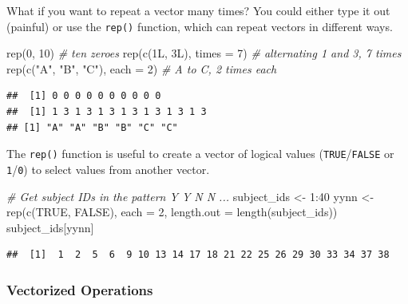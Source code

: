 \documentclass[
  oneside]{book}
\newenvironment{Shaded}{\begin{snugshade}}{\end{snugshade}}
\newcommand{\AttributeTok}[1]{\textcolor[rgb]{0.77,0.63,0.00}{#1}}
\newcommand{\CommentTok}[1]{\textcolor[rgb]{0.56,0.35,0.01}{\textit{#1}}}
\newcommand{\ConstantTok}[1]{\textcolor[rgb]{0.00,0.00,0.00}{#1}}
\newcommand{\DecValTok}[1]{\textcolor[rgb]{0.00,0.00,0.81}{#1}}
\newcommand{\FunctionTok}[1]{\textcolor[rgb]{0.00,0.00,0.00}{#1}}
\newcommand{\NormalTok}[1]{#1}
\newcommand{\OtherTok}[1]{\textcolor[rgb]{0.56,0.35,0.01}{#1}}
\newcommand{\SpecialCharTok}[1]{\textcolor[rgb]{0.00,0.00,0.00}{#1}}
\newcommand{\StringTok}[1]{\textcolor[rgb]{0.31,0.60,0.02}{#1}}
\begin{document}
What if you want to repeat a vector many times? You could either type it out (painful) or use the \texttt{rep()} function, which can repeat vectors in different ways.

\begin{Shaded}
\begin{Highlighting}[]
\FunctionTok{rep}\NormalTok{(}\DecValTok{0}\NormalTok{, }\DecValTok{10}\NormalTok{)                      }\CommentTok{\# ten zeroes}
\FunctionTok{rep}\NormalTok{(}\FunctionTok{c}\NormalTok{(1L, 3L), }\AttributeTok{times =} \DecValTok{7}\NormalTok{)       }\CommentTok{\# alternating 1 and 3, 7 times}
\FunctionTok{rep}\NormalTok{(}\FunctionTok{c}\NormalTok{(}\StringTok{"A"}\NormalTok{, }\StringTok{"B"}\NormalTok{, }\StringTok{"C"}\NormalTok{), }\AttributeTok{each =} \DecValTok{2}\NormalTok{) }\CommentTok{\# A to C, 2 times each}
\end{Highlighting}
\end{Shaded}

\begin{verbatim}
##  [1] 0 0 0 0 0 0 0 0 0 0
##  [1] 1 3 1 3 1 3 1 3 1 3 1 3 1 3
## [1] "A" "A" "B" "B" "C" "C"
\end{verbatim}

The \texttt{rep()} function is useful to create a vector of logical values (\texttt{TRUE}/\texttt{FALSE} or \texttt{1}/\texttt{0}) to select values from another vector.

\begin{Shaded}
\begin{Highlighting}[]
\CommentTok{\# Get subject IDs in the pattern Y Y N N ...}
\NormalTok{subject\_ids }\OtherTok{\textless{}{-}} \DecValTok{1}\SpecialCharTok{:}\DecValTok{40}
\NormalTok{yynn }\OtherTok{\textless{}{-}} \FunctionTok{rep}\NormalTok{(}\FunctionTok{c}\NormalTok{(}\ConstantTok{TRUE}\NormalTok{, }\ConstantTok{FALSE}\NormalTok{), }\AttributeTok{each =} \DecValTok{2}\NormalTok{, }
            \AttributeTok{length.out =} \FunctionTok{length}\NormalTok{(subject\_ids))}
\NormalTok{subject\_ids[yynn]}
\end{Highlighting}
\end{Shaded}

\begin{verbatim}
##  [1]  1  2  5  6  9 10 13 14 17 18 21 22 25 26 29 30 33 34 37 38
\end{verbatim}

\hypertarget{vectorized_ops}{%
\subsubsection{Vectorized Operations}\label{vectorized_ops}}
\end{document}
